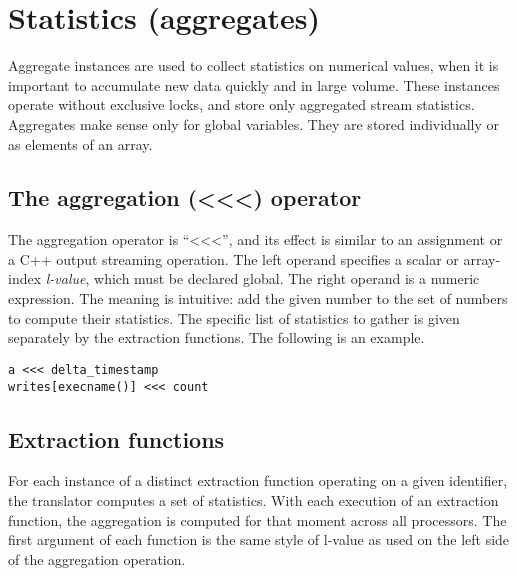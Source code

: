 \documentclass[twoside,english]{article}
\newenvironment{vindent}
{\begin{list}{}{\setlength{\listparindent}{6pt}}
\item[]}
{\end{list}}
\begin{document}
\section{Statistics (aggregates)\label{sec:Statistics}}
Aggregate instances are used to collect statistics on numerical values, when
it is important to accumulate new data quickly and in large volume. These
instances operate without exclusive locks, and store only aggregated stream
statistics. Aggregates make sense only for global variables. They are stored
individually or as elements of an array.

\subsection{The aggregation (\textless\hspace{1 sp}\textless\hspace{1 sp}\textless) operator}
\index{\textless\hspace{1 sp}\textless\hspace{1 sp}\textless}
The aggregation operator is {}``\textless\hspace{1 sp}\textless\hspace{1 sp}\textless'',
and its effect is similar to an assignment or a C++ output streaming operation.
The left operand specifies a scalar or array-index \emph{l-value}, which
must be declared global. The right operand is a numeric expression. The meaning
is intuitive: add the given number to the set of numbers to compute their
statistics. The specific list of statistics to gather is given separately
by the extraction functions. The following is an example.

\begin{vindent}
\begin{verbatim}
a <<< delta_timestamp
writes[execname()] <<< count
\end{verbatim}
\end{vindent}

\subsection{Extraction functions}
For each instance of a distinct extraction function operating on a given
identifier, the translator computes a set of statistics. With each execution
of an extraction function, the aggregation is computed for that moment across
all processors. The first argument of each function is the same style of
l-value as used on the left side of the aggregation operation.
\end{document}
